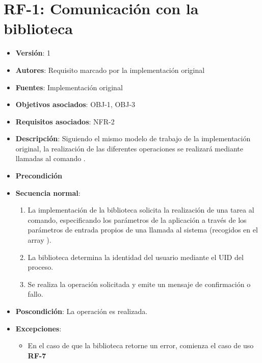 \documentclass[letterpaper,10pt,spanish]{sphinxmanual}
\begin{document}
\section{RF-1: Comunicación con la biblioteca}
\label{analysis/fr:rf-1-comunicacion-con-la-biblioteca}\begin{itemize}
\item {} 
\textbf{Versión}: 1

\item {} 
\textbf{Autores}: Requisito marcado por la implementación original

\item {} 
\textbf{Fuentes}: Implementación original

\item {} 
\textbf{Objetivos asociados}: OBJ-1, OBJ-3

\item {} 
\textbf{Requisitos asociados}: NFR-2

\item {} 
\textbf{Descripción}: Siguiendo el mismo modelo de trabajo de la implementación original, la realización de las diferentes operaciones se realizará mediante llamadas al comando .

\item {} 
\textbf{Precondición}

\item {} 
\textbf{Secuencia normal}:
\begin{enumerate}
\item {} 
La implementación de la biblioteca solicita la realización de una tarea al comando, especificando los parámetros de la aplicación a través de los parámetros de entrada propios de una llamada al sistema (recogidos en el array ).

\item {} 
La biblioteca determina la identidad del usuario mediante el UID del proceso.

\item {} 
Se realiza la operación solicitada y emite un mensaje de confirmación o fallo.

\end{enumerate}

\item {} 
\textbf{Poscondición}: La operación es realizada.

\item {} 
\textbf{Excepciones}:
\begin{itemize}
\item {} 
En el caso de que la biblioteca retorne un error, comienza el caso de uso \textbf{RF-7}


\end{itemize}
\end{itemize}
\end{document}
